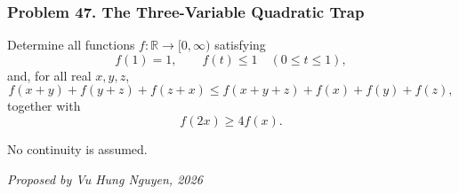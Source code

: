 \subsubsection*{Problem 47. The Three-Variable Quadratic Trap}

\begin{exercisebox}[hard]

Determine all functions $f:\mathbb R\to[0,\infty)$ satisfying
\[
f(1)=1,\qquad f(t)\le1\quad(0\le t\le1),
\]
and, for all real $x,y,z$,
\[
\boxed{
f(x+y)+f(y+z)+f(z+x)
\le f(x+y+z)+f(x)+f(y)+f(z),
}
\tag{1}
\]
together with
\[
\boxed{\qquad f(2x)\ge4f(x).\qquad} \tag{2}
\]

No continuity is assumed.

\begin{flushright}
\textit{Proposed by Vu Hung Nguyen, 2026}
\end{flushright}


\end{exercisebox}
